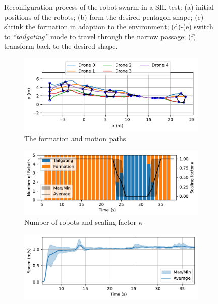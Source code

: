 \begin{figure}
\begin{subfigure}[b]{0.325\textwidth}
    \caption{}
    \end{subfigure}
    \caption{Reconfiguration process of the robot swarm in a SIL test: (a) initial positions of the robots; (b) form the desired pentagon shape; (c) shrink the formation in adaption to the environment; (d)-(e) switch to \textit{``tailgating''} mode to travel through the narrow passage; (f) transform back to the desired shape.}
    \label{fig:snap}
\end{figure}

\begin{figure}
    \centering
    \begin{subfigure}[b]{0.495\textwidth}
    \includegraphics[width=\textwidth]{paper3/images/gazebo_path.pdf}
    \caption{The formation and motion paths}
    \label{fig:gazebo_path}
    \end{subfigure}
    \begin{subfigure}[b]{0.495\textwidth}
    \includegraphics[width=\textwidth]{paper3/images/gazebo_correlation.pdf}
    \caption{Number of robots and scaling factor $\kappa$}
    \label{fig:gazebo_mode}
    \end{subfigure}
    \begin{subfigure}[b]{0.495\textwidth}
    \includegraphics[width=\textwidth]{paper3/images/gazebo_speed.pdf}

\end{subfigure}
\end{figure}

